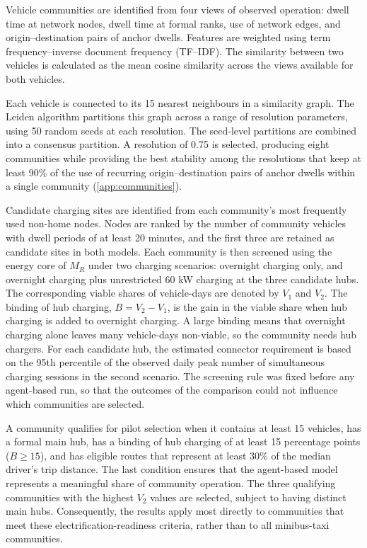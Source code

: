 \documentclass{elsarticle}
\newcommand{\MR}{\ensuremath{M_R}}
\begin{document}
Vehicle communities are identified from four views of observed operation: dwell time at network nodes, dwell time at formal ranks, use of network edges, and origin--destination pairs of anchor dwells. Features are weighted using term frequency--inverse document frequency (TF--IDF). The similarity between two vehicles is calculated as the mean cosine similarity across the views available for both vehicles.

Each vehicle is connected to its 15 nearest neighbours in a similarity graph. The Leiden algorithm partitions this graph across a range of resolution parameters, using 50 random seeds at each resolution. The seed-level partitions are combined into a consensus partition. A resolution of 0.75 is selected, producing eight communities while providing the best stability among the resolutions that keep at least 90\% of the use of recurring origin--destination pairs of anchor dwells within a single community (\ref{app:communities}).

Candidate charging sites are identified from each community's most frequently used non-home nodes. Nodes are ranked by the number of community vehicles with dwell periods of at least 20 minutes, and the first three are retained as candidate sites in both models. Each community is then screened using the energy core of \(\MR\) under two charging scenarios: overnight charging only, and overnight charging plus unrestricted 60 kW charging at the three candidate hubs. The corresponding viable shares of vehicle-days are denoted by \(V_1\) and \(V_2\). The binding of hub charging, \(B = V_2 - V_1\), is the gain in the viable share when hub charging is added to overnight charging. A large binding means that overnight charging alone leaves many vehicle-days non-viable, so the community needs hub chargers. For each candidate hub, the estimated connector requirement is based on the 95th percentile of the observed daily peak number of simultaneous charging sessions in the second scenario. The screening rule was fixed before any agent-based run, so that the outcomes of the comparison could not influence which communities are selected.

A community qualifies for pilot selection when it contains at least 15 vehicles, has a formal main hub, has a binding of hub charging of at least 15 percentage points (\(B \geq 15\)), and has eligible routes that represent at least 30\% of the median driver's trip distance. The last condition ensures that the agent-based model represents a meaningful share of community operation. The three qualifying communities with the highest \(V_2\) values are selected, subject to having distinct main hubs. Consequently, the results apply most directly to communities that meet these electrification-readiness criteria, rather than to all minibus-taxi communities. 
\end{document}
